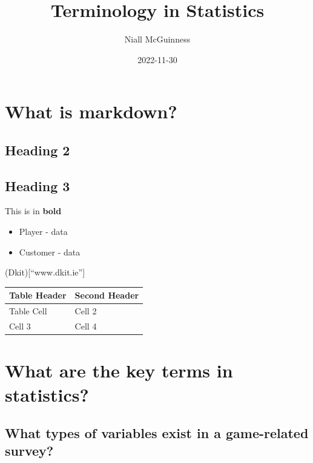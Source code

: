 \documentclass[
]{article}
\title{Terminology in Statistics}
\author{Niall McGuinness}
\date{2022-11-30}
\providecommand{\tightlist}{%
  \setlength{\itemsep}{0pt}\setlength{\parskip}{0pt}}
\begin{document}
\maketitle

\hypertarget{what-is-markdown}{%
\section{What is markdown?}\label{what-is-markdown}}

\hypertarget{heading-2}{%
\subsection{Heading 2}\label{heading-2}}

\hypertarget{heading-3}{%
\subsection{Heading 3}\label{heading-3}}

This is in \textbf{bold}

\begin{itemize}
\tightlist
\item
  Player - data
\item
  Customer - data
\end{itemize}

(Dkit){[}``www.dkit.ie''{]}

\begin{longtable}[]{@{}ll@{}}
\toprule()
Table Header & Second Header \\
\midrule()
\endhead
Table Cell & Cell 2 \\
Cell 3 & Cell 4 \\
\bottomrule()
\end{longtable}

\hypertarget{what-are-the-key-terms-in-statistics}{%
\section{What are the key terms in
statistics?}\label{what-are-the-key-terms-in-statistics}}

\hypertarget{what-types-of-variables-exist-in-a-game-related-survey}{%
\subsection{What types of variables exist in a game-related
survey?}\label{what-types-of-variables-exist-in-a-game-related-survey}}
\end{document}
